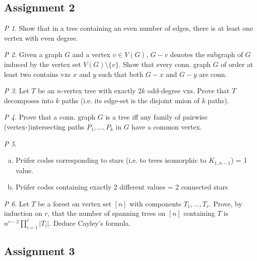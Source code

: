 \documentclass[11pt, fleqn, a4paper, landscape]{article}
\theoremstyle{plain} %
\theoremstyle{remark} %
\newtheorem{problem}{P}
\theoremstyle{definition} %
\begin{document}
\begin{multicols}{5}
\subsection{Assignment 2}

\begin{problem}
Show that in a tree containing an even number of edges, there is at least one
vertex with even degree.
\end{problem}

\begin{problem}
Given a graph $G$ and a vertex $v \in V (G)$, $G - v$ denotes the subgraph of $G$ induced by the vertex set $V (G)\setminus\{v\}$. Show that every conn. graph $G$ of order at least two contains vxs $x$ and $y$ such that both $G- x$ and $G-y$ are conn.
\end{problem}

\begin{problem}
Let $T$ be an $n$-vertex tree with exactly $2k$ odd-degree vxs. Prove that $T$ decomposes into $k$ paths (i.e. its edge-set is the disjoint union of $k$ paths).
\end{problem}

\begin{problem}
Prove that a conn. graph $G$ is a tree iff any family of pairwise (vertex-)intersecting paths $P_1,\dots,P_k$ in $G$ have a common vertex.
\end{problem}

\begin{problem}
\begin{enumerate}[(a)]
\item Prüfer codes corresponding to stars (i.e. to trees isomorphic to $K_{1,n-1}$) = 1 value.
\item Prüfer codes containing exactly 2 different values = 2 connected stars
\end{enumerate}
\end{problem}

\begin{problem}
Let $T$ be a forest on vertex set $[n]$ with components $T_1,\dots,T_r$. Prove, by induction on $r$, that the number of spanning trees on $[n]$ containing $T$ is $n^{r-2}\prod_{i=1}^{r}|T_i|$. Deduce Cayley's formula.
\end{problem}

\subsection{Assignment 3}


\end{multicols}
\end{document}
